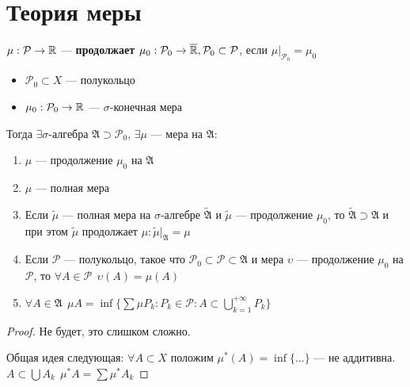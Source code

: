

\cfoot{}



\section*{Теория меры}

\begin{definition}
    \(\mu : \mathcal{P}\to\mathbb{R}\) --- \textbf{продолжает} \(\mu_0 : \mathcal{P}_0 \to \overline {\mathbb{R}}, \mathcal{P}_0\subset \mathcal{P}\), если \(\mu\big|_{\mathcal{P}_0} = \mu_0\)
\end{definition}

\begin{theorem}\itemfix
    \begin{itemize}
        \item \(\mathcal{P}_0 \subset X\) --- полукольцо
        \item \(\mu_0 : \mathcal{P}_0\to\mathbb{R}\) --- \(\sigma\)-конечная мера
    \end{itemize}
    Тогда \(\exists \sigma\)-алгебра \(\mathfrak{A}\supset \mathcal{P}_0\), \(\exists \mu\) --- мера на \(\mathfrak{A}\):
    \begin{enumerate}
        \item \(\mu\) --- продолжение \(\mu_0\) на \(\mathfrak{A}\)
        \item \(\mu\) --- полная мера
        \item Если \(\tilde \mu\) --- полная мера на \(\sigma\)-алгебре \(\tilde{\mathfrak{A}}\) и \(\tilde{\mu}\) --- продолжение \(\mu_0\), то \(\tilde{\mathfrak{A}}\supset \mathfrak{A}\) и при этом \(\tilde \mu\) продолжает \(\mu : \tilde \mu\big|_{\mathfrak{A}} = \mu\)
        \item Если \(\mathcal{P}\) --- полукольцо, такое что \(\mathcal{P}_0 \subset \mathcal{P} \subset \mathfrak{A}\) и мера \(\upsilon\) --- продолжение \(\mu_0\) на \(\mathcal{P}\), то \(\forall A\in \mathcal{P}\ \ \upsilon(A) = \mu(A)\)
        \item \(\forall A\in \mathfrak{A}\ \ \mu A = \inf \{\sum \mu P_k : P_k \in \mathcal{P} : A \subset \bigcup\limits_{k = 1}^{ +\infty} P_k\} \)
    \end{enumerate}
\end{theorem}
\begin{proof}
    Не будет, это слишком сложно.

    Общая идея следующая: \(\forall A\subset X\) положим \(\mu^*(A) = \inf \{\dots \} \) --- не аддитивна. \(A\subset \bigcup A_k \ \ \mu^*A = \sum \mu^* A_k\)
\end{proof}

